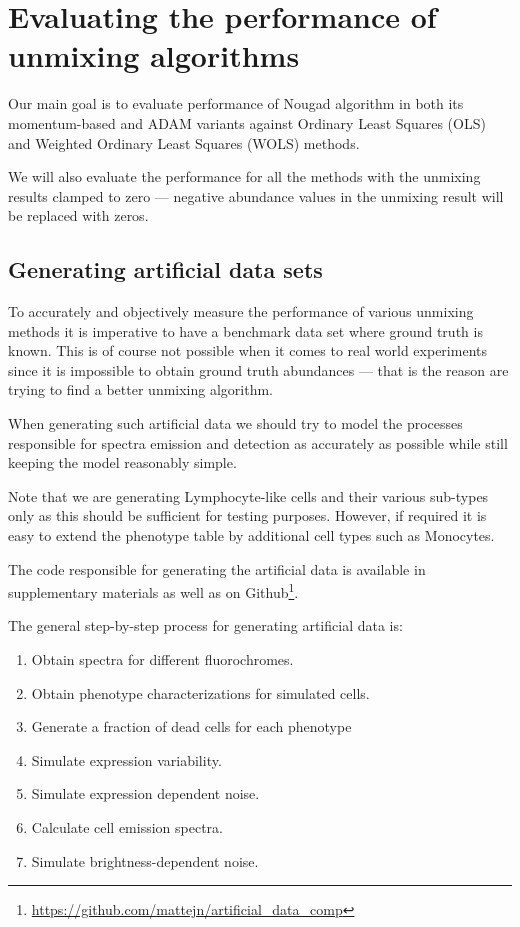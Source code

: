 \chapter{Evaluating the performance of unmixing algorithms}

Our main goal is to evaluate performance of Nougad algorithm in both its momentum-based and ADAM variants against Ordinary Least Squares (OLS) and Weighted Ordinary Least Squares (WOLS) methods. 

We will also evaluate the performance for all the methods with the unmixing results clamped to zero --- negative abundance values in the unmixing result will be replaced with zeros.

\section{Generating artificial data sets}

To accurately and objectively measure the performance of various unmixing methods it is imperative to have a benchmark data set where ground truth is known. This is of course not possible when it comes to real world experiments since it is impossible to obtain ground truth abundances --- that is the reason are trying to find a better unmixing algorithm.

When generating such artificial data we should try to model the processes responsible for spectra emission and detection as accurately as possible while still keeping the model reasonably simple.

Note that we are generating Lymphocyte-like cells and their various sub-types only as this should be sufficient for testing purposes. However, if required it is easy to extend the phenotype table by additional cell types such as Monocytes.

The code responsible for generating the artificial data is available in supplementary materials as well as on Github\footnote{\url{https://github.com/mattejn/artificial_data_comp}}.

The general step-by-step process for generating artificial data is: 
\begin{enumerate}
\item{Obtain spectra for different fluorochromes.}
\item{Obtain phenotype characterizations for simulated cells.}
\item{Generate a fraction of dead cells for each phenotype}
\item{Simulate expression variability.}
\item{Simulate expression dependent noise.}
\item{Calculate cell emission spectra.}
\item{Simulate brightness-dependent noise.}
\end{enumerate}

